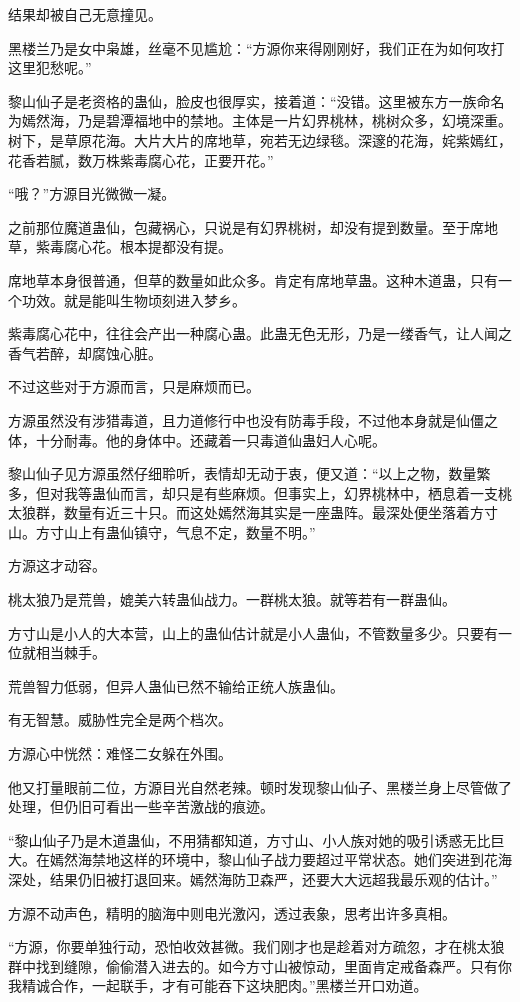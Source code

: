 \begin{this_body}
结果却被自己无意撞见。

黑楼兰乃是女中枭雄，丝毫不见尴尬：“方源你来得刚刚好，我们正在为如何攻打这里犯愁呢。”

黎山仙子是老资格的蛊仙，脸皮也很厚实，接着道：“没错。这里被东方一族命名为嫣然海，乃是碧潭福地中的禁地。主体是一片幻界桃林，桃树众多，幻境深重。树下，是草原花海。大片大片的席地草，宛若无边绿毯。深邃的花海，姹紫嫣红，花香若腻，数万株紫毒腐心花，正要开花。”

“哦？”方源目光微微一凝。

之前那位魔道蛊仙，包藏祸心，只说是有幻界桃树，却没有提到数量。至于席地草，紫毒腐心花。根本提都没有提。

席地草本身很普通，但草的数量如此众多。肯定有席地草蛊。这种木道蛊，只有一个功效。就是能叫生物顷刻进入梦乡。

紫毒腐心花中，往往会产出一种腐心蛊。此蛊无色无形，乃是一缕香气，让人闻之香气若醉，却腐蚀心脏。

不过这些对于方源而言，只是麻烦而已。

方源虽然没有涉猎毒道，且力道修行中也没有防毒手段，不过他本身就是仙僵之体，十分耐毒。他的身体中。还藏着一只毒道仙蛊妇人心呢。

黎山仙子见方源虽然仔细聆听，表情却无动于衷，便又道：“以上之物，数量繁多，但对我等蛊仙而言，却只是有些麻烦。但事实上，幻界桃林中，栖息着一支桃太狼群，数量有近三十只。而这处嫣然海其实是一座蛊阵。最深处便坐落着方寸山。方寸山上有蛊仙镇守，气息不定，数量不明。”

方源这才动容。

桃太狼乃是荒兽，媲美六转蛊仙战力。一群桃太狼。就等若有一群蛊仙。

方寸山是小人的大本营，山上的蛊仙估计就是小人蛊仙，不管数量多少。只要有一位就相当棘手。

荒兽智力低弱，但异人蛊仙已然不输给正统人族蛊仙。

有无智慧。威胁性完全是两个档次。

方源心中恍然：难怪二女躲在外围。

他又打量眼前二位，方源目光自然老辣。顿时发现黎山仙子、黑楼兰身上尽管做了处理，但仍旧可看出一些辛苦激战的痕迹。

“黎山仙子乃是木道蛊仙，不用猜都知道，方寸山、小人族对她的吸引诱惑无比巨大。在嫣然海禁地这样的环境中，黎山仙子战力要超过平常状态。她们突进到花海深处，结果仍旧被打退回来。嫣然海防卫森严，还要大大远超我最乐观的估计。”

方源不动声色，精明的脑海中则电光激闪，透过表象，思考出许多真相。

“方源，你要单独行动，恐怕收效甚微。我们刚才也是趁着对方疏忽，才在桃太狼群中找到缝隙，偷偷潜入进去的。如今方寸山被惊动，里面肯定戒备森严。只有你我精诚合作，一起联手，才有可能吞下这块肥肉。”黑楼兰开口劝道。


\end{this_body}

